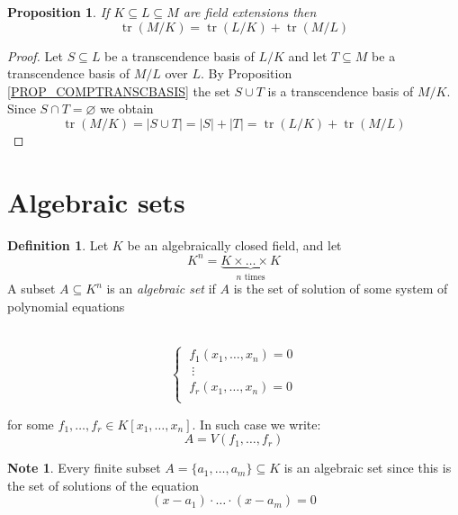\documentclass[12pt, letterpaper, oneside]{article}
\theoremstyle{plain}
\newtheorem{proposition}[theorem]{Proposition}
\theoremstyle{definition}
\newtheorem{definition}[theorem]{Definition}
\newtheorem{note}[theorem]{Note}
\newcommand{\tr}{\operatorname{tr}}
\newcommand{\vs}{\vskip 5mm}
\begin{document}
\vs\vs

\begin{proposition}
If $K\subseteq L \subseteq M$ are field extensions then 
$$\tr(M/K) = \tr(L/K) + \tr(M/L)$$
\end{proposition}


\vs

\begin{proof}
Let $S\subseteq L$ be a transcendence basis of $L/K$  and let 
$T\subseteq M$ be a transcendence basis of $M/L$ over $L$.
By Proposition \ref{PROP_COMPTRANSCBASIS} the set $S\cup T$
is a transcendence basis of $M/K$. Since  $S\cap T = \varnothing$ we obtain 
$$\tr(M/K) = |S\cup T| = |S|+ |T| = \tr(L/K) + \tr(M/L)$$



\end{proof}








\newpage
\section{Algebraic sets}
\label{SEC_ALGSETS}

\begin{definition}
Let $K$ be an algebraically closed field, and let 
$$K^{n} = \underbrace{K \times {\dots} \times K}_{n \text{ times}}$$
A subset $A\subseteq K^{n}$ is an \emph{algebraic set} if 
$A$ is the set of solution of some system of polynomial equations


\vskip -5mm

\ 
$$
\begin{cases}
\ f_{1}(x_{1}, \dots, x_{n})  = 0 \\
\  \ \vdots    \\
\ f_{r}(x_{1}, \dots, x_{n})  = 0 \\
\end{cases}
$$

for some $f_{1}, \dots, f_{r}\in K[x_{1}, \dots, x_{n}]$. In such case we write:
$$A = V(f_{1}, \dots, f_{r})$$
\end{definition}

\vs\vs

\begin{note}
 Every finite subset $A= \{a_{1}, \dots, a_{m}\} \subseteq K$ is an algebraic set 
since this is the set of solutions of the equation 
$$(x-a_{1})\cdot{\dots}\cdot(x-a_{m}) = 0$$
\end{note}
\end{document}
